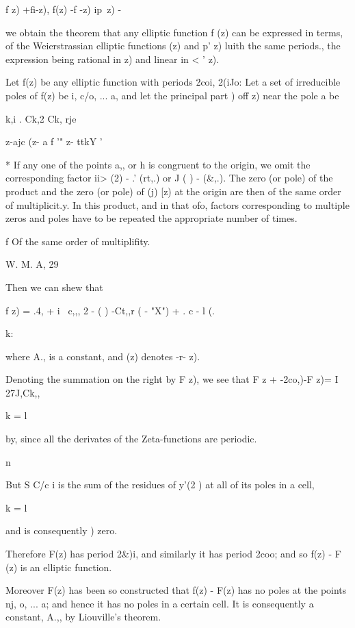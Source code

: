 {f z) +fi-z), f(z) -f -z) ip\ z) -\

we obtain the theorem that any elliptic function f (z) can be
expressed in terms, of the Weierstrassian elliptic functions (z) and
p' z) luith the same periods., the expression being rational in z) and
linear in < ' z).


Let f(z) be any elliptic function with periods 2coi, 2(iJo: Let a set
of irreducible poles of f(z) be i, c/o, ... a, and let the principal
part ) off z) near the pole a be

 k,i . Ck,2 Ck, rje

z-ajc (z- a f '" z- ttkY '

* If any one of the points a,, or h is congruent to the origin, we
omit the corresponding factor ii> (2) - .' (rt,.) or J ( ) - (\&,.).
The zero (or pole) of the product and the zero (or pole) of (j) [z) at
the origin are then of the same order of multiplicit.y. In this
product, and in that ofo, factors corresponding to multiple
zeros and poles have to be repeated the appropriate number of times.

f Of the same order of multiplifity.

W. M. A, 29

%
%

Then we can shew that

f z) = .4, + i \ c,,, 2 - ( ) -Ct,,r ( - "X") + . c - l (.

k:

where A., is a constant, and (z) denotes -r- z).

Denoting the summation on the right by F z), we see that F z +
-2co,)-F z)= I 27J,Ck,,

k = l

by, since all the derivates of the Zeta-functions are
periodic.

n

But S C/c i is the sum of the residues of y'(2 ) at all of its poles
in a cell,

k = l

and is consequently ) zero.

Therefore F(z) has period 2\&)i, and similarly it has period 2coo; and
so f(z) - F (z) is an elliptic function.

Moreover F(z) has been so constructed that f(z) - F(z) has no poles at
the points nj, o, ... a; and hence it has no poles in a certain cell.
It is consequently a constant, A.,, by Liouville's theorem.

}
